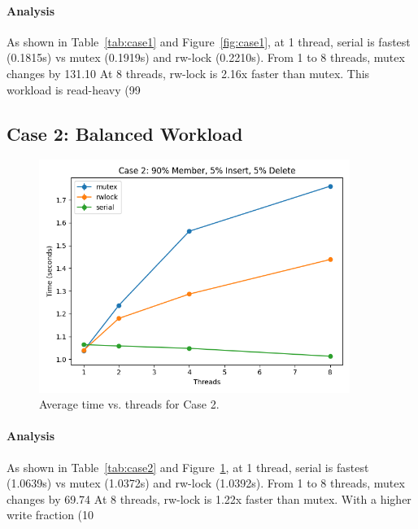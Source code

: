 \documentclass{article}
\begin{document}
\paragraph{Analysis}
As shown in Table~\ref{tab:case1} and Figure~\ref{fig:case1}, at 1 thread, serial is fastest (0.1815s) vs mutex (0.1919s) and rw-lock (0.2210s).
From 1 to 8 threads, mutex changes by 131.10%
At 8 threads, rw-lock is 2.16x faster than mutex.
This workload is read-heavy (99%
\newpage
\subsection*{Case 2: Balanced Workload}
\begin{figure}[h!]
\centering
\includegraphics[width=0.9\textwidth]{report/graphs/case2_plot.png}
\caption{Average time vs. threads for Case 2.}
\label{fig:case2}
\end{figure}
\paragraph{Analysis}
As shown in Table~\ref{tab:case2} and Figure~\ref{fig:case2}, at 1 thread, serial is fastest (1.0639s) vs mutex (1.0372s) and rw-lock (1.0392s).
From 1 to 8 threads, mutex changes by 69.74%
At 8 threads, rw-lock is 1.22x faster than mutex.
With a higher write fraction (10%
\newpage
\end{document}
